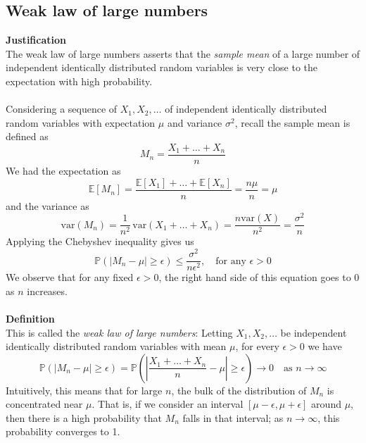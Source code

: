 \documentclass{report}
\begin{document}
\subsection{Weak law of large numbers}
\textbf{Justification}\\
The weak law of large numbers asserts that the \textit{sample mean} of a large number of independent
identically distributed random variables is very close to the expectation with high probability.\\
\vspace{1mm}\\
Considering a sequence of $X_1,X_2,\ldots$ of independent identically distributed random variables with 
expectation $\mu$ and variance $\sigma^2$, recall the sample mean
is defined as
\begin{equation*}
M_n=\frac{X_1+\ldots+X_n}{n}
\end{equation*}
We had the expectation as
\begin{equation*}
\mathbb{E}[M_n]=\frac{\mathbb{E}[X_1]+\ldots+\mathbb{E}[X_n]}{n}
=\frac{n\mu}{n}=\mu
\end{equation*}
and the variance as
\begin{equation*}
\text{var}(M_n)=\frac{1}{n^2}\,\text{var}(X_1+\ldots+X_n)=\frac{n\text{var}(X)}{n^2}=\frac{\sigma^2}{n}
\end{equation*}
Applying the Chebyshev inequality gives us
\begin{equation*}
\mathbb{P}(|M_n-\mu|\geq\epsilon)\leq\frac{\sigma^2}{n\epsilon^2},\quad\text{for any $\epsilon>0$}
\end{equation*}
We observe that for any fixed $\epsilon>0$, the right hand side of this equation goes to 0 as $n$ increases.\\
\vspace{1mm}\\
\textbf{Definition}\\
This is called the \textit{weak law of large numbers}: 
Letting $X_1,X_2,\ldots$ be independent identically distributed random variables with mean $\mu$, 
for every $\epsilon>0$ we have
\begin{equation*}
\boxed{\mathbb{P}(|M_n-\mu|\geq\epsilon)=\mathbb{P}\left(\left|\frac{X_1+\ldots+X_n}{n}-\mu\right|\geq\epsilon\right)
\to0\quad\text{as $n\to\infty$}}
\end{equation*}
Intuitively, this means that for large $n$, the bulk of the distribution of $M_n$ is concentrated near $\mu$.
That is, if we consider an interval $[\mu-\epsilon,\mu+\epsilon]$ around $\mu$, then there
is a high probability that $M_n$ falls in that interval; as $n\to\infty$, this probability converges to 1.
\newpage
\end{document}
